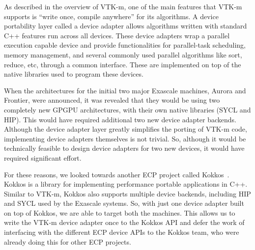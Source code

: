 As described in the overview of VTK-m,
one of the main features that VTK-m supports is ``write once, compile anywhere'' for its algorithms.
A device portability layer called a device adapter allows algorithms written with standard C++ features run across all devices.
These device adapters wrap a parallel execution capable device and provide functionalities for parallel-task scheduling, memory management, and several commonly used parallel algorithms like sort, reduce, etc, through a common interface.
These are implemented on top of the native libraries used to program these devices.

When the architectures for the initial two major Exascale machines, Aurora and Frontier, were announced, it was revealed that they would be using two completely new GPGPU architectures, with their own native libraries (SYCL and HIP).
This would have required additional two new device adapter backends.
Although the device adapter layer greatly simplifies the porting of VTK-m code, implementing device adapters themselves is not trivial.
So, although it would be technically feasible to design device adapters for two new devices, it would have required significant effort.

For these reasons, we looked towards another ECP project called Kokkos~\cite{Edwards2014, Trott2022}. Kokkos is a library for implementing performance portable applications in C++. Similar to VTK-m, Kokkos also supports multiple device backends, including HIP and SYCL used by the Exascale systems. So, with just one device adapter built on top of Kokkos, we are able to target both the machines.
This allows us to write the VTK-m device adapter once to the Kokkos API and defer the work of interfacing with the different ECP device APIs to the Kokkos team, who were already doing this for other ECP projects.

